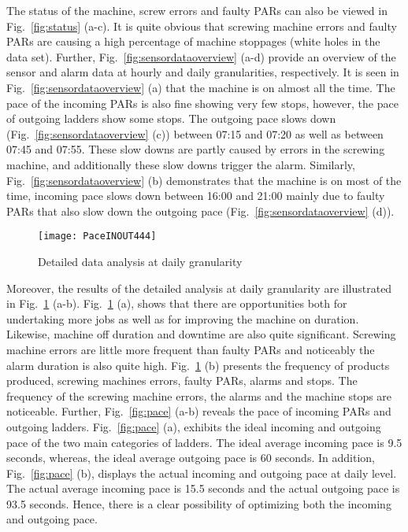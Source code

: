 \documentclass[runningheads]{llncs}
\begin{document}
The status of the machine, screw errors and faulty PARs can also be viewed in Fig.~\ref{fig:status} (a-c). It is quite obvious that screwing machine errors and faulty PARs are causing a high percentage of machine stoppages (white holes in the data set). Further, Fig.~\ref{fig:sensordataoverview} (a-d) provide an overview of the sensor and alarm data at hourly and daily granularities, respectively. It is seen in Fig.~\ref{fig:sensordataoverview} (a) that the machine is on almost all the time. The pace of the incoming PARs is also fine showing very few stops, however, the pace of outgoing ladders show some stops. The outgoing pace slows down (Fig.~\ref{fig:sensordataoverview} (c)) between 07:15 and 07:20 as well as between 07:45 and 07:55. These slow downs are partly caused by errors in the screwing machine, and additionally these slow downs trigger the alarm. Similarly,  Fig.~\ref{fig:sensordataoverview} (b) demonstrates that the machine is on most of the time, incoming pace slows down between 16:00 and 21:00 mainly due to faulty PARs that also slow down the outgoing pace (Fig.~\ref{fig:sensordataoverview} (d)).

\begin{figure}
\centering
\texttt{[image: PaceINOUT444]} 
\caption{Detailed data analysis at daily granularity \cite{nadeem}}
\label{fig:detailedanalysis}
\end{figure}

Moreover, the results of the detailed analysis at daily granularity are illustrated in Fig.~\ref{fig:detailedanalysis} (a-b). Fig.~\ref{fig:detailedanalysis} (a), shows that there are opportunities both for undertaking more jobs as well as for improving the machine on duration. Likewise, machine off duration and downtime are also quite significant. Screwing machine errors are little more frequent than faulty PARs and noticeably the alarm duration is also quite high. Fig.~\ref{fig:detailedanalysis} (b) presents the frequency of products produced, screwing machines errors, faulty PARs, alarms and stops. The frequency of the screwing machine errors, the alarms and the machine stops are noticeable. Further, Fig.~\ref{fig:pace} (a-b) reveals the pace of  incoming PARs and outgoing ladders. Fig.~\ref{fig:pace} (a), exhibits the ideal incoming and outgoing pace of the two main categories of ladders. The ideal average incoming pace is 9.5 seconds, whereas, the ideal average outgoing pace is 60 seconds. In addition, Fig.~\ref{fig:pace} (b), displays the actual incoming and outgoing pace at daily level. The actual average incoming pace is 15.5 seconds and the actual outgoing pace is 93.5 seconds. Hence, there is a clear possibility of optimizing both the incoming and outgoing pace.
\end{document}
